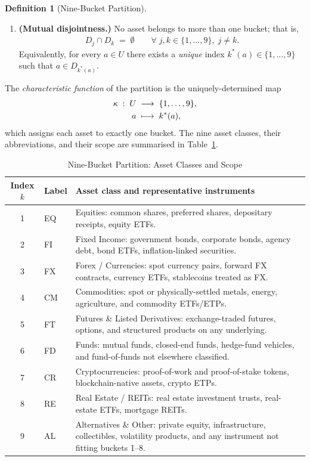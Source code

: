 \documentclass[12pt,openany]{book}
\newcommand{\calU}{\mathcal{U}}
\newcommand{\calD}{\mathcal{D}}
\numberwithin{equation}{chapter}
\theoremstyle{plain}
\theoremstyle{definition}
\newtheorem{definition}[theorem]{Definition}
\theoremstyle{remark}
\def\calU{U}%
\def\calD{D}%
\def\mathcal#1{#1}%
\begin{document}
\begin{definition}[Nine-Bucket Partition]
\begin{enumerate}
  \item \textbf{(Mutual disjointness.)}
        No asset belongs to more than one bucket; that is,
        \begin{align}
          \calD_j \cap \calD_k \;=\; \emptyset
          \qquad \forall\; j,k \in \{1,\ldots,9\},\; j \neq k.
          \label{eq:disjointness}
        \end{align}
        Equivalently, for every $a \in \calU$ there exists a
        \emph{unique} index $k^*(a) \in \{1,\ldots,9\}$ such that
        $a \in \calD_{k^*(a)}$.
\end{enumerate}

\noindent
The \emph{characteristic function} of the partition is the
uniquely-determined map
\begin{align}
  \kappa \;:\; \calU &\;\longrightarrow\; \{1,\ldots,9\}, \notag \\
  a &\;\longmapsto\; k^*(a),
  \label{eq:char-map}
\end{align}
which assigns each asset to exactly one bucket.
The nine asset classes, their abbreviations, and their scope are
summarised in Table~\ref{tab:buckets}.
\end{definition}

\begin{table}[ht]
\centering
\caption{Nine-Bucket Partition: Asset Classes and Scope}
\label{tab:buckets}
\small
\begin{tabularx}{\linewidth}{@{} c l X @{}}
\hline
\textbf{Index $k$} & \textbf{Label} & \textbf{Asset class and representative instruments} \\
\hline
1 & EQ & Equities: common shares, preferred shares, depositary
         receipts, equity ETFs. \\[2pt]
2 & FI & Fixed Income: government bonds, corporate bonds, agency
         debt, bond ETFs, inflation-linked securities. \\[2pt]
3 & FX & Forex / Currencies: spot currency pairs, forward FX
         contracts, currency ETFs, stablecoins treated as FX. \\[2pt]
4 & CM & Commodities: spot or physically-settled metals, energy,
         agriculture, and commodity ETFs/ETPs. \\[2pt]
5 & FT & Futures \& Listed Derivatives: exchange-traded futures,
         options, and structured products on any underlying. \\[2pt]
6 & FD & Funds: mutual funds, closed-end funds, hedge-fund
         vehicles, and fund-of-funds not elsewhere classified. \\[2pt]
7 & CR & Cryptocurrencies: proof-of-work and proof-of-stake
         tokens, blockchain-native assets, crypto ETPs. \\[2pt]
8 & RE & Real Estate / REITs: real estate investment trusts,
         real-estate ETFs, mortgage REITs. \\[2pt]
9 & AL & Alternatives \& Other: private equity, infrastructure,
         collectibles, volatility products, and any instrument
         not fitting buckets 1--8. \\
\hline
\end{tabularx}
\end{table}
\end{document}
